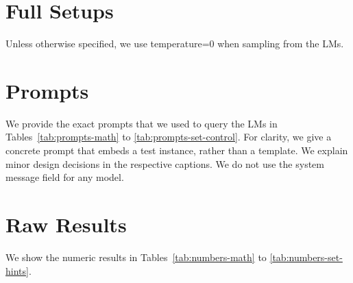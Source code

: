 \section{Full Setups} \label{sec:full-setups}

Unless otherwise specified, we use temperature=0 when sampling from the LMs.











\section{Prompts} \label{sec:prompts}

We provide the exact prompts that we used to query the LMs in Tables~\ref{tab:prompts-math} to \ref{tab:prompts-set-control}. For clarity, we give a concrete prompt that embeds a test instance, rather than a template. We explain minor design decisions in the respective captions. We do not use the system message field for any model.

\section{Raw Results} \label{sec:raw-results}

We show the numeric results in Tables~\ref{tab:numbers-math} to \ref{tab:numbers-set-hints}.





















